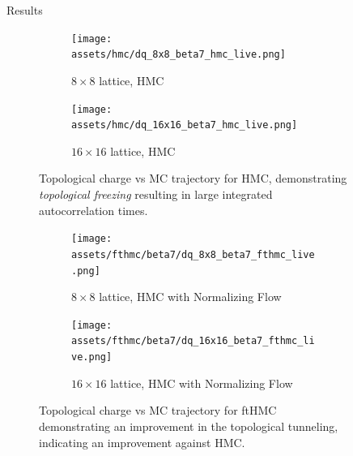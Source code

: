 \documentclass[final]{beamer}
\newlength{\sepwidth}
\newlength{\colwidth}
\newcommand{\separatorcolumn}{\begin{column}{\sepwidth}\end{column}}
\begin{document}
\begin{frame}[t]
\begin{columns}[t]
\begin{column}{\colwidth}
\end{column}

\separatorcolumn

\begin{column}{\colwidth}
  \begin{block}{Results}
    \begin{figure}
      \begin{subfigure}{0.66\columnwidth}
        \centering
        \texttt{[image: assets/hmc/dq\_8x8\_beta7\_hmc\_live.png]}
        \caption{\label{fig:hmc8beta7}\(8\times8\) lattice, HMC}
      \end{subfigure}
      \begin{subfigure}{0.66\columnwidth}
        \centering
        \texttt{[image: assets/hmc/dq\_16x16\_beta7\_hmc\_live.png]}
        \caption{\label{fig:hmc16beta7}\(16\times16\) lattice, HMC}
      \end{subfigure}
      \caption{Topological charge vs MC trajectory for HMC, demonstrating \emph{topological freezing} resulting in large
      integrated autocorrelation times.}
    \end{figure}
    \begin{figure}
      \begin{subfigure}{0.66\columnwidth}
        \centering
          \texttt{[image: assets/fthmc/beta7/dq\_8x8\_beta7\_fthmc\_live.png]}
          \caption{\label{fig:fthmc8beta7}\(8\times8\) lattice, HMC with Normalizing Flow}
      \end{subfigure}
      \begin{subfigure}{0.66\columnwidth}
        \centering
        \texttt{[image: assets/fthmc/beta7/dq\_16x16\_beta7\_fthmc\_live.png]}
        \caption{\label{fig:fthmc16beta7}\(16\times16\) lattice, HMC with Normalizing Flow}
      \end{subfigure}
      \caption{Topological charge vs MC trajectory for ftHMC demonstrating an improvement in the topological tunneling,
      indicating an improvement against HMC.}
    \end{figure}
  \end{block}


\end{column}
\end{columns}
\end{frame}
\end{document}
